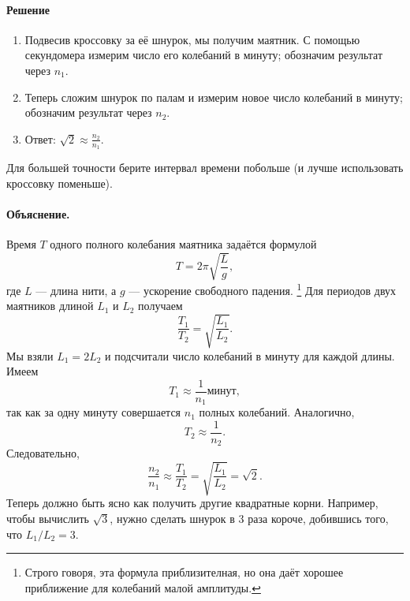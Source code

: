 \paragraph{Решение}

\begin{enumerate}
\item Подвесив кроссовку за её шнурок, мы получим маятник.
С помощью секундомера измерим число его колебаний в минуту;
обозначим результат через $n_1$.

\item Теперь сложим шнурок по палам и измерим новое число колебаний в минуту; обозначим результат через $n_{2}$.

\item Ответ: $\sqrt{2} \approx \frac{n_{2}}{n_{1}}$.
\end{enumerate}
Для большей точности берите интервал времени побольше
(и лучше использовать кроссовку поменьше).

\paragraph{Объяснение.}
Время $T$ одного полного колебания маятника задаётся формулой
\[
T = 2\pi \sqrt{\frac{L}{g}},
\]
где $L$ — длина нити, а $g$ — ускорение свободного падения.%
\footnote{Строго говоря, эта формула приблизителная, но она даёт хорошее приближение для колебаний малой амплитуды.}
Для периодов двух маятников длиной $L_{1}$ и $L_{2}$ получаем
\[
\frac{T_{1}}{T_{2}} = \sqrt{\frac{L_{1}}{L_{2}}}.
\]
Мы взяли $L_{1} = 2L_{2}$ и подсчитали число колебаний в минуту для каждой длины. Имеем
\[
T_{1} \approx \frac{1}{n_{1}}  \text{минут},
\]
так как за одну минуту совершается $n_{1}$ полных колебаний. Аналогично,
\[
T_{2} \approx \frac{1}{n_{2}}.
\]
Следовательно,
\[
\frac{n_{2}}{n_{1}}
\approx
\frac{T_{1}}{T_{2}}
=
\sqrt{\frac{L_{1}}{L_{2}}}
=\sqrt{2}.
\]
Теперь должно быть ясно как получить другие квадратные корни.
Например, чтобы вычислить $\sqrt{3}$, нужно сделать шнурок в 3 раза короче, добившись того, что $L_{1}/L_{2} = 3$.
